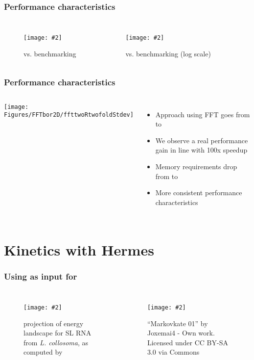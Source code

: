 \documentclass{beamer}
\newcommand{\slidefigure}[2][1]{\centering\texttt{[image: \#2]}}
\begin{document}
\begin{frame}
  \frametitle{Performance characteristics}
  \begin{columns}
    \begin{figure}
      \slidefigure{Figures/FFTbor2D/ffttwoRtwofoldTiming} \caption{\ffttwo vs. \rnatwofold benchmarking}
    \end{figure}

    \begin{figure}
      \slidefigure{Figures/FFTbor2D/ffttwoRtwofoldLogScale} \caption{\ffttwo vs. \rnatwofold benchmarking (log scale)}
    \end{figure}
  \end{columns}
\end{frame}

\begin{frame}
  \frametitle{Performance characteristics}
  \begin{columns}
    \texttt{[image: Figures/FFTbor2D/ffttwoRtwofoldStdev]}

    \begin{itemize}
      \item Approach using FFT goes from  to 
      \item We observe a real performance gain in line with 100x speedup
      \item Memory requirements drop from  to 
      \item More consistent performance characteristics
    \end{itemize}
  \end{columns}
\end{frame}

\section{Kinetics with Hermes}

\begin{frame}
  \frametitle{Using \ffttwo as input for \hermes}

  \begin{columns}
    \begin{figure}
      \slidefigure{Figures/FFTbor2D/ffttwoProbContour} \caption{\twoD projection of energy landscape for SL RNA from {\em L. collosoma}, as computed by \ffttwo}
    \end{figure}

    \begin{figure}
      \slidefigure{Images/markov} \caption{``Markovkate 01'' by Joxemai4 - Own work. Licensed under CC BY-SA 3.0 via Commons}
    \end{figure}
  \end{columns}
\end{frame}
\end{document}
